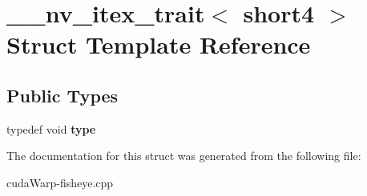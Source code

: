 \hypertarget{struct____nv__itex__trait_3_01short4_01_4}{}\section{\+\_\+\+\_\+nv\+\_\+itex\+\_\+trait$<$ short4 $>$ Struct Template Reference}
\label{struct____nv__itex__trait_3_01short4_01_4}
\subsection*{Public Types}
\begin{DoxyCompactItemize}
\item 
typedef void {\bfseries type}\hypertarget{struct____nv__itex__trait_3_01short4_01_4_a733cb6e5e4552825f884959853507c1b}{}\label{struct____nv__itex__trait_3_01short4_01_4_a733cb6e5e4552825f884959853507c1b}

\end{DoxyCompactItemize}


The documentation for this struct was generated from the following file\+:\begin{DoxyCompactItemize}
\item 
cuda\+Warp-\/fisheye.\+cpp\end{DoxyCompactItemize}
